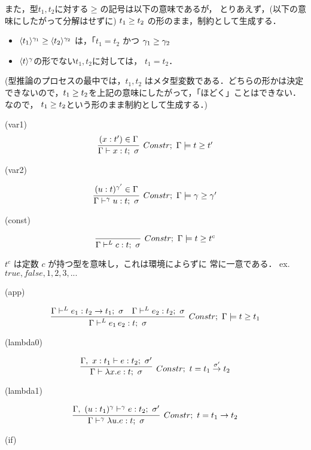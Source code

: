 \documentclass[dvipdfmx]{jsarticle}
\newcommand\longer[2]{{#1} \ord {#2}}
\begin{document}
また，型$t_1, t_2$に対する$\longer{}{}$の記号は以下の意味であるが，
とりあえず，(以下の意味にしたがって分解はせずに)
$\longer{t_1}{t_2}$ の形のまま，制約として生成する．
\begin{itemize}
\item $\longer{\codeT{t_1}{\gamma_1}}{\codeT{t_2}{\gamma_2}}$
  は，「$t_1=t_2$ かつ $\longer{\gamma_1}{\gamma_2}$
\item $\langle{t}\rangle^{\gamma}$の形でない$t_1,t_2$に対しては，
  $t_1 = t_2$．
\end{itemize}

(型推論のプロセスの最中では，$t_1, t_2$ はメタ型変数である．どちらの形かは決定できないので，$\longer{t_1}{t_2}$を上記の意味にしたがって，「ほどく」ことはできない．なので，
$\longer{t_1}{t_2}$という形のまま制約として生成する．)


(var1)
\[
  \infer[Constr;~\Gamma \models \longer{t}{t'}]
  {\Gamma \vdash x:t;~\sigma}
  {(x:t') \in \Gamma
  }
\]

(var2)

\[
  \infer[Constr;~\Gamma \models \longer{\gamma}{\gamma'}]
  {\Gamma \vdash^{\gamma} u:t;~\sigma}
  {(u:t)^{\gamma'} \in \Gamma
  }
\]

(const)

\[
  \infer[Constr;~\Gamma \models \longer{t}{t^c}]
  {\Gamma \vdash^{L} c:t;~\sigma}
  {}
\]

$t^c$ は定数 $c$ が持つ型を意味し，これは環境によらずに 常に一意である．
ex. $true,false, 1,2,3,...$

(app)

\[
  \infer[Constr;~\Gamma \models \longer{t}{t_1}]
  {\Gamma \vdash^L e_1 \, e_2 : t;~\sigma}
  {\Gamma \vdash^L e_1 : t_2 \to t_1;~\sigma
    &\Gamma \vdash^L e_2 : t_2;~\sigma
  }
\]

(lambda0)

\[
  \infer[Constr;~t=\funT{t_1}{t_2}{\sigma'}]
  {\Gamma \vdash \lambda x.e : t;~\sigma}
  {\Gamma,~x:t_1 \vdash e : t_2;~\sigma'}
\]

(lambda1)

\[
  \infer[Constr;~t=\funT{t_1}{t_2}{}]
  {\Gamma \vdash^\gamma \lambda u.e : t;~\sigma}
  {\Gamma,~(u:t_1)^\gamma \vdash^\gamma e : t_2;~\sigma'}
\]


(if)
\end{document}
